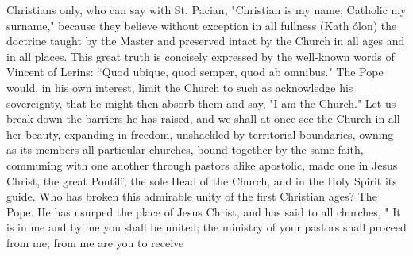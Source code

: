 Christians only, who can say with St. Pacian, "Christian is my name; Catholic my surname," because they believe without exception in all fullness (Kath ólon) the doctrine taught by the Master and preserved intact by the Church in all ages and in all places. This great truth is concisely expressed by the well-known words of Vincent of Lerins: “Quod ubique, quod semper, quod ab omnibus." The Pope would, in his own interest, limit the Church to such as acknowledge his sovereignty, that he might then absorb them and say, "I am the Church." Let us break down the barriers he has raised, and we shall at once see the Church in all her beauty, expanding in freedom, unshackled by territorial boundaries, owning as its members all particular churches, bound together by the same faith, communing with one another through pastors alike apostolic, made one in Jesus Christ, the great Pontiff, the sole Head of the Church, and in the Holy Spirit its guide. Who has broken this admirable unity of the first Christian ages? The Pope. He has usurped the place of Jesus Christ, and has said to all churches, " It is in me and by me you shall be united; the ministry of your pastors shall proceed from me; from me are you to receive

